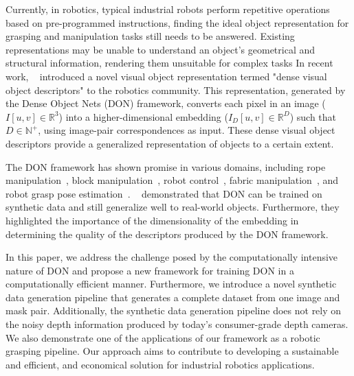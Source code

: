 Currently, in robotics, typical industrial robots perform repetitive operations based on pre-programmed instructions,
finding the ideal object representation for grasping and manipulation tasks still needs to be answered.
Existing representations may be unable to understand an object's geometrical and structural information, rendering them unsuitable for complex tasks
In recent work, \citeauthor{florence2018dense}~\cite{florence2018dense} introduced a novel visual object representation termed "dense visual object descriptors" to the robotics community.
This representation, generated by the Dense Object Nets (DON) framework, converts each pixel in an image ($I[u, v] \in \mathbb{R}^3$)
into a higher-dimensional embedding ($I_D[u, v] \in \mathbb{R}^D$) such that $D \in \mathbb{N}^+$,
using image-pair correspondences as input. These dense visual object descriptors provide a generalized representation of objects to a certain extent.


The DON framework has shown promise in various domains, including rope manipulation~\cite{rope-manipulation},
block manipulation~\cite{block-manipulation}, robot control~\cite{florence2019self}, fabric manipulation~\cite{fabric-manipulation},
and robot grasp pose estimation~\parencites{kupcsik2021supervised}{adrian2022efficient}. \citeauthor{adrian2022efficient}~\cite{adrian2022efficient}
demonstrated that DON can be trained on
synthetic data and still generalize well to real-world objects. Furthermore, they highlighted the importance of the
dimensionality of the embedding in determining the quality of the descriptors produced by the DON framework.


In this paper, we address the challenge posed by the computationally intensive nature of DON and propose a new framework for training DON
in a computationally efficient manner. Furthermore, we introduce a novel synthetic data generation pipeline that generates a complete dataset
from one image and mask pair. Additionally, the synthetic data generation pipeline does not rely on the noisy depth information produced by
today's consumer-grade depth cameras. We also demonstrate one of the applications of our framework as a robotic grasping pipeline.
Our approach aims to contribute to developing a sustainable and efficient, and economical solution for industrial robotics applications.
